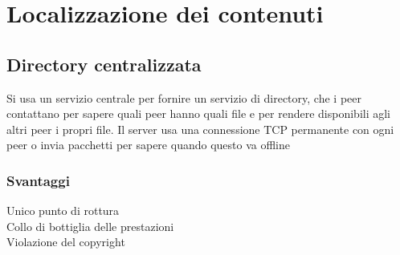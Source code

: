 \section{Localizzazione dei contenuti}
\subsection{Directory centralizzata}
Si usa un servizio centrale per fornire un servizio di directory, che i peer contattano per sapere quali peer hanno quali file e per rendere disponibili agli altri peer i propri file.
Il server usa una connessione TCP permanente con ogni peer o invia pacchetti per sapere quando questo va offline
\subsubsection{Svantaggi}
\begin{description}
    \item[Unico punto di rottura]
    \item[Collo di bottiglia delle prestazioni]
    \item[Violazione del copyright]
\end{description}

